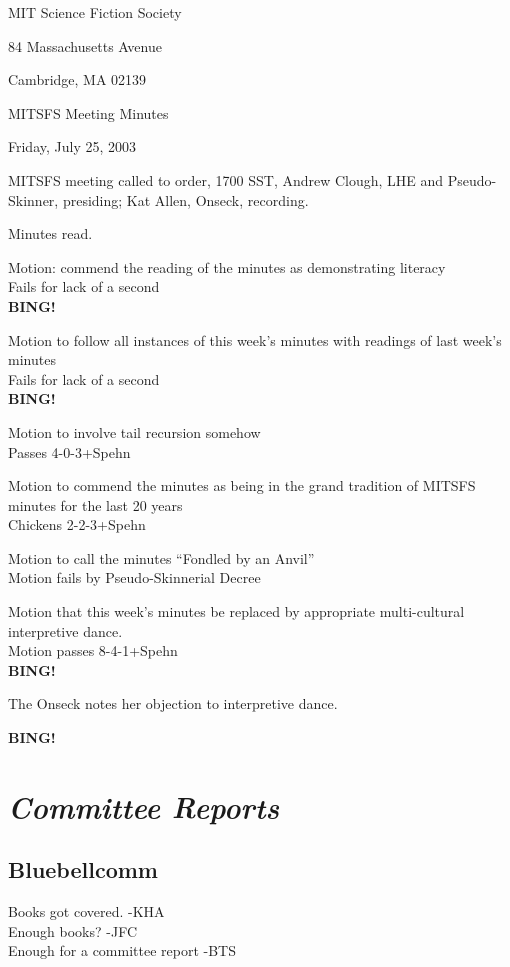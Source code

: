 \documentclass[12pt]{article}
\newcommand{\bing}{{\bf BING!} }
\newcommand{\goto}[1]{\bing \vskip 12pt \section*{{\em{#1}}}}
\begin{document}
\begin{center}

MIT Science Fiction Society 

84 Massachusetts Avenue

Cambridge, MA 02139

\vspace{12pt}

MITSFS Meeting Minutes 

Friday, July 25, 2003

\end{center}
 
\vspace{18pt}

\setlength{\parskip}{6pt}

\noindent
MITSFS meeting called to order, 1700 SST, Andrew Clough, LHE and
Pseudo-Skinner, presiding; Kat Allen, Onseck, recording.

Minutes read.

Motion: commend the reading of the minutes as demonstrating literacy\\
Fails for lack of a second\\
\bing

Motion to follow all instances of this week's minutes with readings of
last week's minutes\\
Fails for lack of a second \\
\bing

Motion to involve tail recursion somehow\\
Passes 4-0-3+Spehn

Motion to commend the minutes as being in the grand tradition of
MITSFS minutes for the last 20 years\\
Chickens 2-2-3+Spehn

Motion to call the minutes ``Fondled by an Anvil'' \\
Motion fails by Pseudo-Skinnerial Decree

Motion that this week's minutes be replaced by appropriate
multi-cultural interpretive dance.\\
Motion passes 8-4-1+Spehn\\
\bing

The Onseck notes her objection to interpretive dance.

\goto{Committee Reports}
\subsection{Bluebellcomm}
Books got covered. -KHA\\
Enough books? -JFC\\
Enough for a committee report -BTS\\
\end{document}
